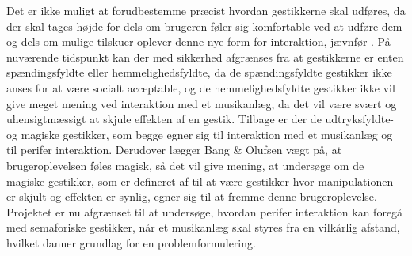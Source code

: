 Det er ikke muligt at forudbestemme præcist hvordan gestikkerne skal udføres, da der skal tages højde for dels om brugeren føler sig komfortable ved at udføre dem og dels om mulige tilskuer oplever denne nye form for interaktion, jævnfør . På nuværende tidspunkt kan der med sikkerhed afgrænses fra at gestikkerne er enten spændingsfyldte eller hemmelighedsfyldte, da de spændingsfyldte gestikker ikke anses for at være socialt acceptable, \parencite[s. 277]{PDF:WouldYouDoThat} og de hemmelighedsfyldte gestikker ikke vil give meget mening ved interaktion med et musikanlæg, da det vil være svært og uhensigtmæssigt at skjule effekten af en gestik. Tilbage er der de udtryksfyldte- og magiske gestikker, som begge egner sig til interaktion med et musikanlæg og til perifer interaktion. Derudover lægger Bang $\&$ Olufsen vægt på, at brugeroplevelsen føles magisk, så det vil give mening, at undersøge om de magiske gestikker, som er defineret af \textcite[s. 276]{PDF:WouldYouDoThat} til at være gestikker hvor manipulationen er skjult og effekten er synlig, egner sig til at fremme denne brugeroplevelse. \blankline
%
Projektet er nu afgrænset til at undersøge, hvordan perifer interaktion kan foregå med semaforiske gestikker, når et musikanlæg skal styres fra en vilkårlig afstand, hvilket danner grundlag for en problemformulering.
